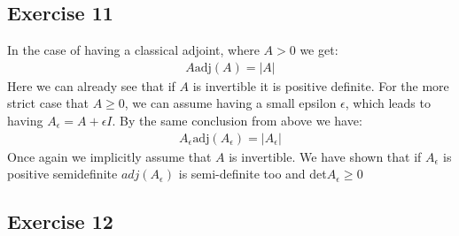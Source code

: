 \subsection{Exercise 11}
In the case of having a classical adjoint, where $A > 0$ we get:
\begin{gather*}
A \text{adj}(A) = |A|
\end{gather*}
Here we can already see that if $A$ is invertible it is positive definite.
For the more strict case that $A \geq 0$, we can assume having a small epsilon $\epsilon$, which leads to having $A_{\epsilon} = A + \epsilon I$.
By the same conclusion from above we have:
\begin{gather*}
A_{\epsilon} \text{adj}(A_{\epsilon}) = |A_{\epsilon}|
\end{gather*}
Once again we implicitly assume that $A$ is invertible. We have shown that if $A_\epsilon$ is positive semidefinite $adj(A_\epsilon)$ is semi-definite too and det$A_{\epsilon}\geq 0$
\subsection{Exercise 12}
